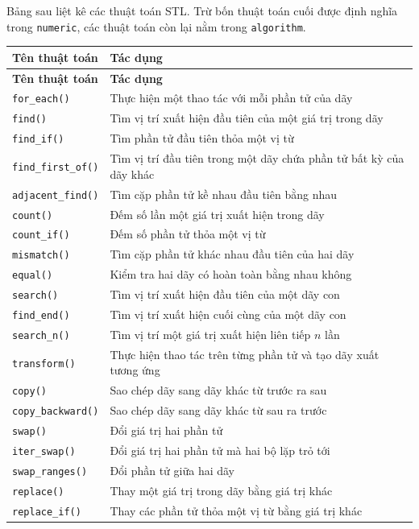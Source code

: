 \documentclass[11pt]{article}
\begin{document}
Bảng sau liệt kê các thuật toán STL. Trừ bốn thuật toán cuối được định nghĩa
trong \verb|numeric|, các thuật toán còn lại nằm trong \verb|algorithm|.

\begin{longtable}{p{}p{}}
\hline
\textbf{Tên thuật toán} & \textbf{Tác dụng}\\
\hline
\endfirsthead
\hline
\textbf{Tên thuật toán} & \textbf{Tác dụng}\\
\hline
\endhead
\verb|for_each()| & Thực hiện một thao tác với mỗi phần tử của dãy\\
\verb|find()| & Tìm vị trí xuất hiện đầu tiên của một giá trị trong dãy\\
\verb|find_if()| & Tìm phần tử đầu tiên thỏa một vị từ\\
\verb|find_first_of()| & Tìm vị trí đầu tiên trong một dãy chứa phần tử bất kỳ của dãy khác\\
\verb|adjacent_find()| & Tìm cặp phần tử kề nhau đầu tiên bằng nhau\\
\verb|count()| & Đếm số lần một giá trị xuất hiện trong dãy\\
\verb|count_if()| & Đếm số phần tử thỏa một vị từ\\
\verb|mismatch()| & Tìm cặp phần tử khác nhau đầu tiên của hai dãy\\
\verb|equal()| & Kiểm tra hai dãy có hoàn toàn bằng nhau không\\
\verb|search()| & Tìm vị trí xuất hiện đầu tiên của một dãy con\\
\verb|find_end()| & Tìm vị trí xuất hiện cuối cùng của một dãy con\\
\verb|search_n()| & Tìm vị trí một giá trị xuất hiện liên tiếp \(n\) lần\\
\verb|transform()| & Thực hiện thao tác trên từng phần tử và tạo dãy xuất tương ứng\\
\verb|copy()| & Sao chép dãy sang dãy khác từ trước ra sau\\
\verb|copy_backward()| & Sao chép dãy sang dãy khác từ sau ra trước\\
\verb|swap()| & Đổi giá trị hai phần tử\\
\verb|iter_swap()| & Đổi giá trị hai phần tử mà hai bộ lặp trỏ tới\\
\verb|swap_ranges()| & Đổi phần tử giữa hai dãy\\
\verb|replace()| & Thay một giá trị trong dãy bằng giá trị khác\\
\verb|replace_if()| & Thay các phần tử thỏa một vị từ bằng giá trị khác\\

\end{longtable}
\end{document}
